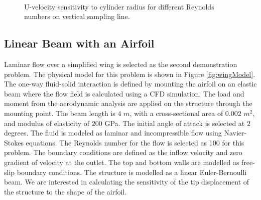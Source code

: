 \documentclass[12pt]{aiaa-pretty}
\begin{document}
\begin{figure}[H]
{	}
	\quad
	\\
	\quad
	\caption{U-velocity sensitivity to cylinder radius for different Reynolds numbers on vertical sampling line.}
	\label{fig:cylinderVelocitySensitivity}
\end{figure}
%

\subsection{Linear Beam with an Airfoil}
Laminar flow over a simplified wing is selected as the second demonstration problem. The physical model for this problem is shown in Figure \ref{fig:wingModel}. The one-way fluid-solid interaction is defined by mounting the airfoil on an elastic beam where the flow field is calculated using a CFD simulation. The load and moment from the aerodynamic analysis are applied on the structure through the mounting point. The beam length is $4$ $m$, with a cross-sectional area of $0.002$ $m^2$, and modulus of elasticity of $200$ GPa. The initial angle of attack is selected at $2$ degrees. The fluid is modeled as laminar and incompressible flow using Navier-Stokes equations. The Reynolds number for the flow is selected as 100 for this problem. The boundary conditions are defined as the inflow velocity and zero gradient of velocity at the outlet. The top and bottom walls are modelled as free-slip boundary conditions. The structure is modelled as a linear Euler-Bernoulli beam. We are interested in calculating the sensitivity of the tip displacement of the structure to the shape of the airfoil.
\end{document}
